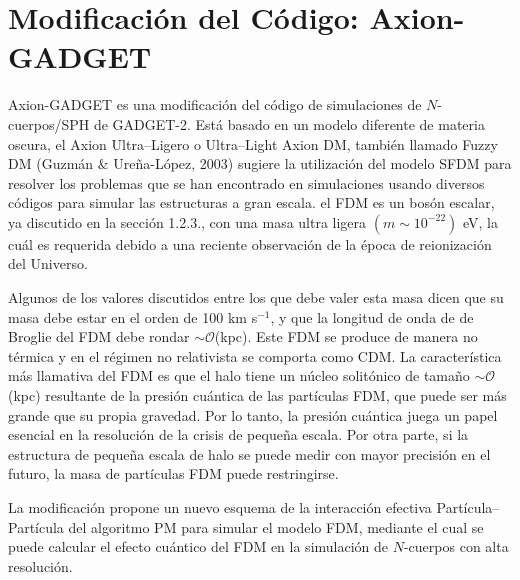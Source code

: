 \documentclass[a4paper,openright,12pt]{book}
\begin{document}
\section{Modificación del Código: Axion-GADGET}
Axion-GADGET \cite{3.1} es una modificación del código de simulaciones de $N$-cuerpos/SPH de GADGET-2. Está basado en un modelo diferente de materia oscura, el Axion Ultra--Ligero o Ultra--Light Axion DM, también llamado Fuzzy DM (Guzmán \& Ureña-López, 2003) sugiere la utilización del modelo SFDM para resolver los problemas que se han encontrado en simulaciones usando diversos códigos para simular las estructuras a gran escala. el FDM es un bosón escalar, ya discutido en la sección 1.2.3., con una masa ultra ligera $(m \sim 10^{-22})$ eV, la cuál es requerida debido a una reciente observación de la época de reionización del Universo. 

Algunos de los valores discutidos entre los que debe valer esta masa dicen que su masa debe estar en el orden de 100 km s$^{-1}$, y que la longitud de onda de de Broglie del FDM debe rondar $\sim \mathcal{O}$(kpc). Este FDM se produce de manera no térmica y en el régimen no relativista se comporta como CDM. La característica más llamativa del FDM es que el halo tiene un núcleo solitónico de tamaño $\sim \mathcal{O} $(kpc) resultante de la presión cuántica de las partículas FDM, que puede ser más grande que su propia gravedad. Por lo tanto, la presión cuántica juega un papel esencial en la resolución de la crisis de pequeña escala. Por otra parte, si la estructura de pequeña escala de halo se puede medir con mayor precisión en el futuro, la masa de partículas FDM puede restringirse. 

La modificación propone un nuevo esquema de la interacción efectiva Partícula--Partícula del algoritmo PM para simular el modelo FDM, mediante el cual se puede calcular el efecto cuántico del FDM en la simulación de $N$-cuerpos con alta resolución.
\end{document}
